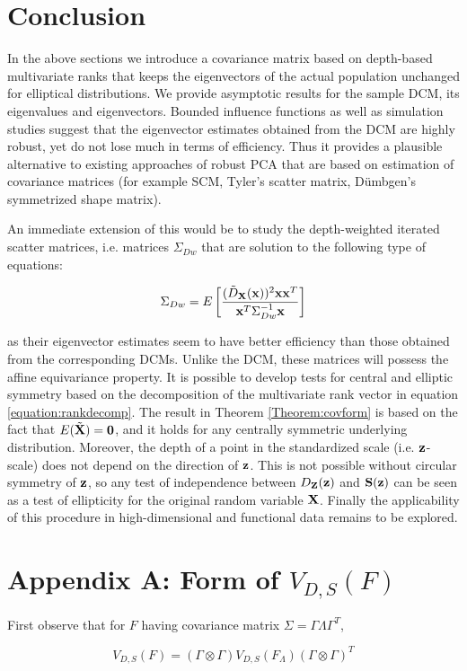 \documentclass[fleqn,11pt]{article}
\begin{document}
\section{Conclusion}
In the above sections we introduce a covariance matrix based on depth-based multivariate ranks that keeps the eigenvectors of the actual population unchanged for elliptical distributions. We provide asymptotic results for the sample DCM, its eigenvalues and eigenvectors. Bounded influence functions as well as simulation studies suggest that the eigenvector estimates obtained from the DCM are highly robust, yet do not lose much in terms of efficiency. Thus it provides a plausible alternative to existing approaches of robust PCA that are based on estimation of covariance matrices (for example SCM, Tyler's scatter matrix, D\"{u}mbgen's symmetrized shape matrix).

An immediate extension of this would be to study the depth-weighted iterated scatter matrices, i.e. matrices $\Sigma_{Dw}$ that are solution to the following type of equations:

$$ \Sigma_{Dw} = E \left[ \frac{(\tilde D_{\mathbf{X}}({\bf{x}}))^2 {\bf{x}} {\bf{x}}^T}{{\bf{x}}^T \Sigma_{Dw}^{-1} {\bf{x}}} \right] $$

as their eigenvector estimates seem to have better efficiency than those obtained from the corresponding DCMs. Unlike the DCM, these matrices will possess the affine equivariance property. It is possible to develop tests for central and elliptic symmetry based on the decomposition of the multivariate rank vector in equation \ref{equation:rankdecomp}. The result in Theorem \ref{Theorem:covform} is based on the fact that $E(\tilde {{\mathbf{X}}}) = \bf0$, and it holds for any centrally symmetric underlying distribution. Moreover, the depth of a point in the standardized scale (i.e. ${\bf{z}}$-scale) does not depend on the direction of ${\bf{z}}$. This is not possible without circular symmetry of ${\bf{z}}$, so any test of independence between $D_{\mathbf{Z}} ({\bf{z}})$ and ${\mathbf{S}} ({\bf{z}})$ can be seen as a test of ellipticity for the original random variable ${\mathbf{X}}$. Finally the applicability of this procedure in high-dimensional and functional data remains to be explored.

\section*{Appendix A: \textbf{Form of $V_{D,S}(F)$}}
First observe that for $F$ having covariance matrix $\Sigma = \Gamma\Lambda\Gamma^T$,

$$ V_{D,S}(F)  = (\Gamma \otimes \Gamma) V_{D,S}(F_\Lambda) (\Gamma \otimes \Gamma)^T$$
\end{document}

